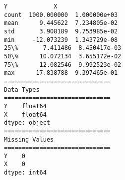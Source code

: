 \documentclass[11pt]{article}
\begin{document}
    \begin{Verbatim}[commandchars=\\\{\}]
                 Y             X
count  1000.000000  1.000000e+03
mean      9.445622  7.234805e-02
std       3.908189  9.753985e-02
min     -12.073239  1.343729e-08
25\%       7.411486  8.450417e-03
50\%      10.072134  3.655172e-02
75\%      12.082546  9.992523e-02
max      17.838788  9.397465e-01
==============================
Data Types
==============================
Y    float64
X    float64
dtype: object
==============================
Missing Values
==============================
Y    0
X    0
dtype: int64
    \end{Verbatim}

    \begin{center}
    \end{center}
    { \hspace*{\fill} \\}
    
    \begin{center}
    \end{center}
    { \hspace*{\fill} \\}
    
    \begin{center}
    \end{center}
    { \hspace*{\fill} \\}
    
    \begin{center}
    \end{center}
    { \hspace*{\fill} \\}
    
\end{document}
